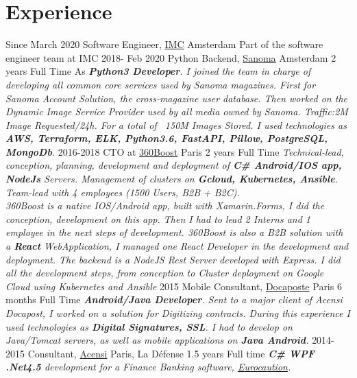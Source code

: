 \documentclass{emonides-cv}
\begin{document}
\section{Experience}
\begin{entrylist}
  \entry
    {Since March 2020}
    {Software Engineer, \href{https://www.imc.com/eu/}{IMC} {\normalfont Amsterdam}}
    {}
    {Part of the software engineer team at IMC }
  \entry
    {2018- Feb 2020}
    {Python Backend, \href{https://www.sanoma.nl/over-sanoma-nl/}{Sanoma} {\normalfont Amsterdam}}
    {2 years Full Time}
    {As \emph{\textbf{Python3 Developer}. I joined the team in charge of developing all common core services used by Sanoma magazines. First for Sanoma Account Solution, the cross-magazine user database. Then worked on the Dynamic Image Service Provider used by all media owned by Sanoma. Traffic:2M Image Requested/24h. For a total of ~150M Images Stored.
    I used technologies as \textbf{AWS, Terraform, ELK, Python3.6, FastAPI, Pillow, PostgreSQL, MongoDb}.}}
  \entry
    {2016-2018}
    {CTO at \href{https://fr.linkedin.com/company/360boost/}{360Boost}  {\normalfont Paris}}
    {2 years Full Time}
    {\emph{Technical-lead, conception, planning, development and deployment of \textbf{C\# Android/IOS app, NodeJs} Servers.
     Management of clusters on \textbf{Gcloud, Kubernetes, Ansible}. Team-lead with 4 employees (1500 Users, B2B + B2C).
    \\360Boost is a native IOS/Android app, built with Xamarin.Forms, I did the conception, development on this app.
    Then I had to lead 2 Interns and 1 employee in the next steps of development.
    360Boost is also a B2B solution with a \textbf{React} WebApplication, I managed one React Developer
    in the development and deployment.
    The backend is a NodeJS Rest Server developed with Express. I did all the development steps, from conception
    to Cluster deployment on Google Cloud using Kubernetes and Ansible}}
  \entry
    {2015}
    {Mobile Consultant, \href{https://www.docapost.com/en/}{Docaposte} {\normalfont Paris}}
    {6 months Full Time}
    {\emph{\textbf{Android/Java Developer}. Sent to a major client of Acensi Docapost, I worked on a solution for Digitizing contracts.
    During this experience I used technologies as \textbf{Digital Signatures, SSL}.
    I had to develop on Java/Tomcat servers, as well as mobile applications on \textbf{Java Android}.}}
  \entry
    {2014-2015}
    {Consultant, \href{https://www.acensi.fr/}{Acensi} {\normalfont Paris, La Défense}}
    {1.5 years Full time}
    {\emph{\textbf{C\# WPF .Net4.5} development for a Finance Banking software, \href{https://www.eurocaution.net/}{Eurocaution}.
}}
\end{entrylist}
\end{document}
